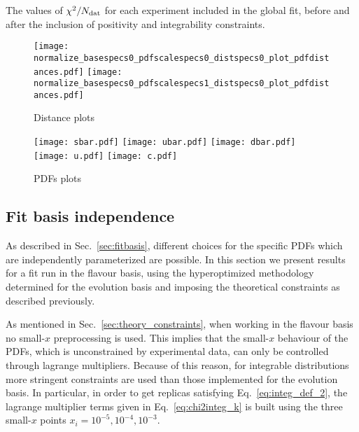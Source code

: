   \begin{table}[htbp!]
    \centering
    
    \caption{The values of $\chi^2/N_{\rm dat}$ for each experiment included in the global fit, before and
    after the inclusion of positivity and integrability constraints.}
    \label{tab:experiments_chi2}
  \end{table}

  \begin{figure}[t!]
    \begin{center}
        \texttt{[image: normalize\_basespecs0\_pdfscalespecs0\_distspecs0\_plot\_pdfdistances.pdf]}
        \texttt{[image: normalize\_basespecs0\_pdfscalespecs1\_distspecs0\_plot\_pdfdistances.pdf]}
        \caption{Distance plots} 
        \label{fig:distances} 
    \end{center}
  \end{figure}

  \begin{figure}[t!]
    \begin{center}
        \texttt{[image: sbar.pdf]}
        \texttt{[image: ubar.pdf]}
        \texttt{[image: dbar.pdf]}
        \texttt{[image: u.pdf]}
        \texttt{[image: c.pdf]}
        \caption{PDFs plots} 
        \label{fig:pdfs_plots} 
    \end{center}
  \end{figure}


\subsection{Fit basis independence}
As described in Sec.~\ref{sec:fitbasis}, different choices for the specific PDFs which are independently
parameterized are possible.
In this section we present results for a fit run in the flavour basis, using the hyperoptimized methodology
determined for the evolution basis and imposing the theoretical constraints as described previously.

%
As mentioned in Sec.~\ref{sec:theory_constraints}, when working in the flavour basis 
no small-$x$ preprocessing is used. This implies that the small-$x$ behaviour of the PDFs, which is unconstrained 
by experimental data, can only be controlled through lagrange multipliers.
Because of this reason, for integrable distributions more stringent constraints are used than those implemented
for the evolution basis. In particular, in order to get replicas satisfying Eq.~\eqref{eq:integ_def_2},
the lagrange multiplier terms given in Eq.~\eqref{eq:chi2integ_k} is built using the three small-$x$
points $x_i = 10^{-5}, 10^{-4}, 10^{-3}$. 

